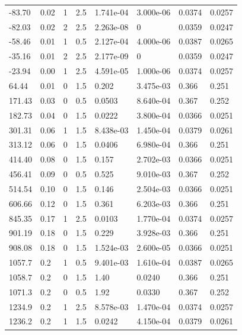 \documentclass[preview]{standalone}
\begin{document}
{{\begin{tabular}{L{1.2cm}C{1.2cm} C{0.3cm}C{0.5cm} C{1.4cm}C{1.4cm} C{1.4cm}C{1.4cm}}
  -83.70  &  0.02  & 1     & 2.5 &  1.741e-04  & 3.000e-06  & 0.0374 &  0.0257   \\ 
  -82.03  &  0.02  & 2     & 2.5 &  2.263e-08  & 0  & 0.0359 &  0.0247   \\ 
  -58.46  &  0.01  & 1     & 0.5 &  2.127e-04  & 4.000e-06  & 0.0387 &  0.0265   \\ 
  -35.16  &  0.01  & 2     & 2.5 &  2.177e-09  & 0  & 0.0359 &  0.0247   \\ 
  -23.94  &  0.00  & 1     & 2.5 &  4.591e-05  & 1.000e-06  & 0.0374 &  0.0257   \\ 
  64.44  &  0.01  & 0     & 1.5 &  0.202  & 3.475e-03  & 0.366 &  0.251   \\ 
  171.43  &  0.03  & 0     & 0.5 &  0.0503  & 8.640e-04  & 0.367 &  0.252   \\ 
  182.73  &  0.04  & 0     & 1.5 &  0.0222  & 3.800e-04  & 0.0366 &  0.0251   \\ 
  301.31  &  0.06  & 1     & 1.5 &  8.438e-03  & 1.450e-04  & 0.0379 &  0.0261   \\ 
  313.12  &  0.06  & 0     & 1.5 &  0.0406  & 6.980e-04  & 0.366 &  0.251   \\ 
  414.40  &  0.08  & 0     & 1.5 &  0.157  & 2.702e-03  & 0.0366 &  0.0251   \\ 
  456.41  &  0.09  & 0     & 0.5 &  0.525  & 9.010e-03  & 0.367 &  0.252   \\ 
  514.54  &  0.10  & 0     & 1.5 &  0.146  & 2.504e-03  & 0.0366 &  0.0251   \\ 
  606.66  &  0.12  & 0     & 1.5 &  0.361  & 6.203e-03  & 0.366 &  0.251   \\ 
  845.35  &  0.17  & 1     & 2.5 &  0.0103  & 1.770e-04  & 0.0374 &  0.0257   \\ 
  901.19  &  0.18  & 0     & 1.5 &  0.229  & 3.928e-03  & 0.366 &  0.251   \\ 
  908.08  &  0.18  & 0     & 1.5 &  1.524e-03  & 2.600e-05  & 0.0366 &  0.0251   \\ 
  1057.7  &   0.2  & 1     & 0.5 &  9.401e-03  & 1.610e-04  & 0.0387 &  0.0265   \\ 
  1058.7  &   0.2  & 0     & 1.5 &  1.40  & 0.0240  & 0.366 &  0.251   \\ 
  1071.3  &   0.2  & 0     & 0.5 &  1.92  & 0.0330  & 0.367 &  0.252   \\ 
  1234.9  &   0.2  & 1     & 2.5 &  8.578e-03  & 1.470e-04  & 0.0374 &  0.0257   \\ 
  1236.2  &   0.2  & 1     & 1.5 &  0.0242  & 4.150e-04  & 0.0379 &  0.0261   \\ 

\end{tabular}}}
\end{document}
